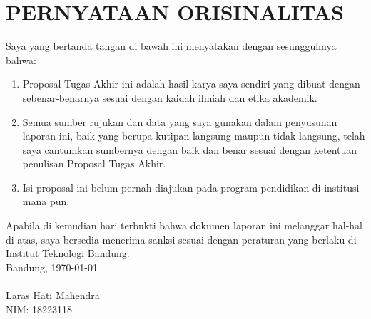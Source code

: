 \chapter*{PERNYATAAN ORISINALITAS}
\vspace{2cm}
Saya yang bertanda tangan di bawah ini menyatakan dengan sesungguhnya bahwa:
\begin{enumerate}
    \item Proposal Tugas Akhir ini adalah hasil karya saya sendiri yang dibuat dengan sebenar-benarnya sesuai dengan kaidah ilmiah dan etika akademik.
    \item Semua sumber rujukan dan data yang saya gunakan dalam penyusunan laporan ini, baik yang berupa kutipan langsung maupun tidak langsung, telah saya cantumkan sumbernya dengan baik dan benar sesuai dengan ketentuan penulisan Proposal Tugas Akhir.
    \item Isi proposal ini belum pernah diajukan pada program pendidikan di institusi mana pun.
\end{enumerate}
Apabila di kemudian hari terbukti bahwa dokumen laporan ini melanggar hal-hal di atas, saya bersedia menerima sanksi sesuai dengan peraturan yang berlaku di Institut Teknologi Bandung.
\\[2cm]
Bandung, \today\\
\\[2cm]

\underline{Laras Hati Mahendra} \\
NIM: 18223118
  